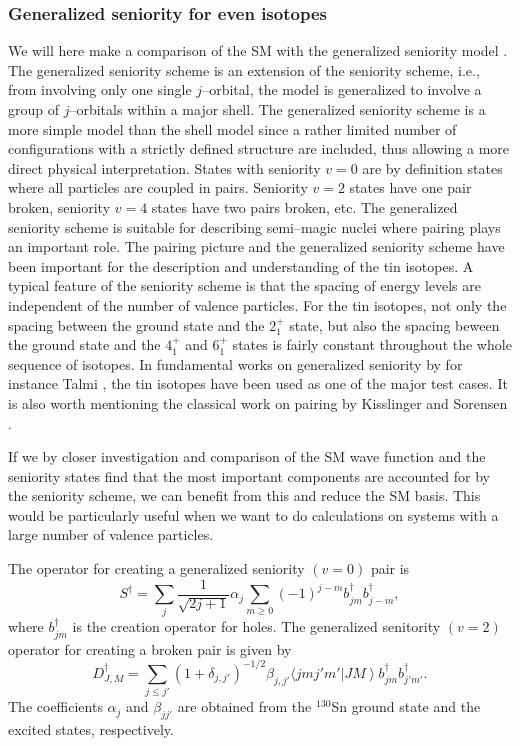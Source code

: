 \subsubsection{Generalized seniority for even isotopes}

We will here make a comparison of the SM with the generalized
seniority model \cite{talm77}. The generalized seniority scheme is an 
extension of the seniority scheme, i.e., from involving only one single 
$j$--orbital, the model is generalized to involve a group of $j$--orbitals 
within a major shell. The generalized seniority scheme is a more simple 
model than the shell model since a rather limited number of configurations 
with a strictly defined structure are included, thus allowing a more
direct physical interpretation. States with seniority $v=0$ are by 
definition states where all particles are coupled in pairs. Seniority 
$v=2$ states have one pair broken, seniority $v=4$ states have two pairs 
broken, etc. The generalized seniority scheme is suitable for describing 
semi--magic nuclei where pairing plays an important role. The pairing picture 
and the generalized seniority scheme have been important for the description 
and understanding of the tin isotopes. A typical feature of the seniority 
scheme is that the spacing of energy levels are independent of the number of 
valence particles. For the tin isotopes, not only the spacing between the 
ground state and the $2^{+}_{1}$ state, but also the spacing beween the 
ground state and the $4^{+}_{1}$ and $6^{+}_{1}$ states is fairly constant 
throughout the whole sequence of isotopes. In fundamental works on generalized 
seniority by for instance Talmi \cite{talm77}, the tin isotopes have been 
used as one of the major test cases. It is also worth mentioning the 
classical work on pairing by Kisslinger and Sorensen \cite{kiss60}. 

If we by closer investigation and comparison of the SM wave function and the
seniority states find that the most important components are accounted for  
by the seniority scheme, we can benefit from this and reduce the SM basis. 
This would be particularly useful when we want to do calculations on systems 
with a large number of valence particles.

The operator for creating a generalized seniority $(v=0)$ pair is
\begin{equation}
    S^{\dagger}= \sum_{j} 
    \frac{1}{\sqrt{2j+1}}\alpha_{j}\sum_{m \geq 0} (-1)^{j-m} b^{\dagger}_{jm}
    b_{j-m}^{\dagger},
    \label{eq:s_dagger}
\end{equation}
where  $b^{\dagger}_{jm}$ is the creation operator for holes.
The generalized senitority $(v=2)$ operator for creating a broken pair 
is given by
\begin{equation}
     D_{J,M}^{\dagger}=
     \sum_{j \leq j'} (1+\delta_{j,j'})^{-1/2}
     \beta_{j,j'} \langle j m j' m'
     \left | JM \right \rangle b^{\dagger}_{jm}b^{\dagger}_{j'm'}.
\end{equation}
The coefficients $\alpha_{j}$ and $\beta_{jj'}$ are obtained from the $^{130}$Sn
ground state and the excited states, respectively.

